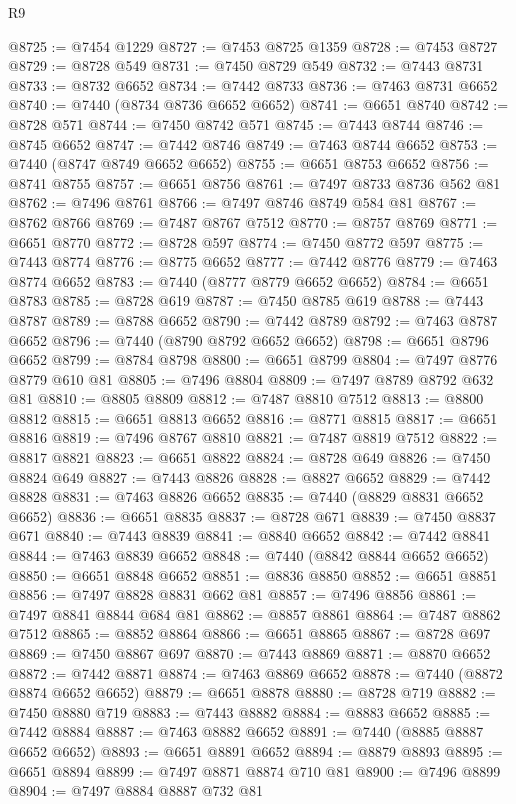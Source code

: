 \begin{lexlean}{R9}
\begin{coremodule}
{{{{{{{{{{{{{{{{{{{{{{{{{{{{{{{{{{{{{{{{{{{{{{{{{{{{{{{{{{{{{{{{{{{{{{{{{{{{{{{{{{{{@8725 := @7454 @1229
@8727 := @7453 @8725 @1359
@8728 := @7453 @8727
@8729 := @8728 @549
@8731 := @7450 @8729 @549
@8732 := @7443 @8731
@8733 := @8732 @6652
@8734 := @7442 @8733
@8736 := @7463 @8731 @6652
@8740 := @7440 (@8734 @8736 @6652 @6652)
@8741 := @6651 @8740
@8742 := @8728 @571
@8744 := @7450 @8742 @571
@8745 := @7443 @8744
@8746 := @8745 @6652
@8747 := @7442 @8746
@8749 := @7463 @8744 @6652
@8753 := @7440 (@8747 @8749 @6652 @6652)
@8755 := @6651 @8753 @6652
@8756 := @8741 @8755
@8757 := @6651 @8756
@8761 := @7497 @8733 @8736 @562 @81
@8762 := @7496 @8761
@8766 := @7497 @8746 @8749 @584 @81
@8767 := @8762 @8766
@8769 := @7487 @8767 @7512
@8770 := @8757 @8769
@8771 := @6651 @8770
@8772 := @8728 @597
@8774 := @7450 @8772 @597
@8775 := @7443 @8774
@8776 := @8775 @6652
@8777 := @7442 @8776
@8779 := @7463 @8774 @6652
@8783 := @7440 (@8777 @8779 @6652 @6652)
@8784 := @6651 @8783
@8785 := @8728 @619
@8787 := @7450 @8785 @619
@8788 := @7443 @8787
@8789 := @8788 @6652
@8790 := @7442 @8789
@8792 := @7463 @8787 @6652
@8796 := @7440 (@8790 @8792 @6652 @6652)
@8798 := @6651 @8796 @6652
@8799 := @8784 @8798
@8800 := @6651 @8799
@8804 := @7497 @8776 @8779 @610 @81
@8805 := @7496 @8804
@8809 := @7497 @8789 @8792 @632 @81
@8810 := @8805 @8809
@8812 := @7487 @8810 @7512
@8813 := @8800 @8812
@8815 := @6651 @8813 @6652
@8816 := @8771 @8815
@8817 := @6651 @8816
@8819 := @7496 @8767 @8810
@8821 := @7487 @8819 @7512
@8822 := @8817 @8821
@8823 := @6651 @8822
@8824 := @8728 @649
@8826 := @7450 @8824 @649
@8827 := @7443 @8826
@8828 := @8827 @6652
@8829 := @7442 @8828
@8831 := @7463 @8826 @6652
@8835 := @7440 (@8829 @8831 @6652 @6652)
@8836 := @6651 @8835
@8837 := @8728 @671
@8839 := @7450 @8837 @671
@8840 := @7443 @8839
@8841 := @8840 @6652
@8842 := @7442 @8841
@8844 := @7463 @8839 @6652
@8848 := @7440 (@8842 @8844 @6652 @6652)
@8850 := @6651 @8848 @6652
@8851 := @8836 @8850
@8852 := @6651 @8851
@8856 := @7497 @8828 @8831 @662 @81
@8857 := @7496 @8856
@8861 := @7497 @8841 @8844 @684 @81
@8862 := @8857 @8861
@8864 := @7487 @8862 @7512
@8865 := @8852 @8864
@8866 := @6651 @8865
@8867 := @8728 @697
@8869 := @7450 @8867 @697
@8870 := @7443 @8869
@8871 := @8870 @6652
@8872 := @7442 @8871
@8874 := @7463 @8869 @6652
@8878 := @7440 (@8872 @8874 @6652 @6652)
@8879 := @6651 @8878
@8880 := @8728 @719
@8882 := @7450 @8880 @719
@8883 := @7443 @8882
@8884 := @8883 @6652
@8885 := @7442 @8884
@8887 := @7463 @8882 @6652
@8891 := @7440 (@8885 @8887 @6652 @6652)
@8893 := @6651 @8891 @6652
@8894 := @8879 @8893
@8895 := @6651 @8894
@8899 := @7497 @8871 @8874 @710 @81
@8900 := @7496 @8899
@8904 := @7497 @8884 @8887 @732 @81
}}}}}}}}}}}}}}}}}}}}}}}}}}}}}}}}}}}}}}}}}}}}}}}}}}}}}}}}}}}}}}}}}}}}}}}}}}}}}}}}}}}}
\end{coremodule}
\end{lexlean}

